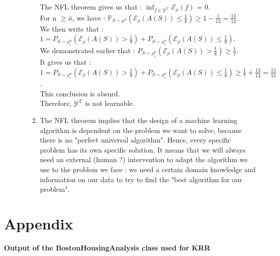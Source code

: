 \documentclass[final,3p,times,12pt]{article}
\begin{document}
\begin{enumerate}
\begin{enumerate}
\begin{enumerate}
The NFL theorem gives us that : $\inf_{f \in \mathcal{Y}^{\mathcal{X}}} \mathcal{E}_\rho(f)$ = 0.\\

For n $\geq\bar{n}$, we have : $\mathbb{P}_{S \sim \rho^n} \left( \mathcal{E}_\rho(A(S)) \leq \frac{1}{8} \right) \geq 1 - \frac{1}{14} = \frac{13}{14}$.\\

We then write that : $1 = P_{S \sim \rho_i^n}( \mathcal{E}_{\rho}(A(S)) > \frac{1}{8}) + P_{S \sim \rho_i^n}( \mathcal{E}_{\rho}(A(S)) \leq \frac{1}{8})$.\\

We demonstrated earlier that : $P_{S \sim \rho_i^n}( \mathcal{E}_{\rho}(A(S)) > \frac{1}{8}) \geq \frac{1}{7}$.\\

It gives us that : $1 = P_{S \sim \rho_i^n}( \mathcal{E}_{\rho}(A(S)) > \frac{1}{8}) + P_{S \sim \rho_i^n}( \mathcal{E}_{\rho}(A(S)) \leq \frac{1}{8}) \geq \frac{1}{7} + \frac{13}{14} = \frac{15}{14}$.\\

This conclusion is absurd.\\

Therefore, $\mathcal{Y}^{\mathcal{X}}$ is not learnable. \\ 
\item The NFL theorem implies that the design of a
machine learning algorithm is dependent on the problem we want to solve, because there is no "perfect universal algorithm". Hence, every specific problem has its own specific solution. It means that we will always need an external (human ?) intervention to adapt the algorithm we use to the problem we face : we need a certain domain knowledge and information on our data to try to find the "best algorithm for our problem".

\end{enumerate}
 
    \end{enumerate}

\end{enumerate}

\appendix

\section*{Appendix}

\textbf{Output of the BostonHousingAnalysis class used for KRR}
\end{document}
